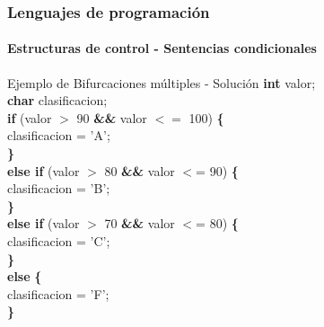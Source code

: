 \documentclass{beamer}
\begin{document}
		\begin{frame}
			\frametitle{Lenguajes de programaci\'on}
			\framesubtitle{Estructuras de control - Sentencias condicionales}

			\begin{block}{Ejemplo de Bifurcaciones m\'ultiples - Soluci\'on}
			{\scriptsize
			\textbf{int} valor;\\
			\textbf{char} clasificacion;\\
			\vspace{0.3cm}
			\textbf{if} (valor $>$ 90 \hspace{0.1cm} \textbf{\&\&} \hspace{0.1cm} valor $<=$ 100) \textbf{\{} \\
  			\hspace{0.3cm} clasificacion = 'A';\\
			\textbf{\}} \\
			\textbf{else if} (valor $>$ 80 \hspace{0.1cm} \textbf{\&\&} \hspace{0.1cm} valor $<$= 90) \textbf{\{} \\
			\hspace{0.3cm} clasificacion = 'B';\\
			\textbf{\}} \\
			\textbf{else if} (valor $>$ 70 \hspace{0.1cm} \textbf{\&\&} \hspace{0.1cm} valor $<$= 80) \textbf{\{} \\
			\hspace{0.3cm} clasificacion = 'C';\\
			\textbf{\}} \\
			\textbf{else} \textbf{\{} \\
			\hspace{0.3cm} clasificacion = 'F';\\
			\textbf{\}}
			}
			\end{block}
		\end{frame}
\end{document}
